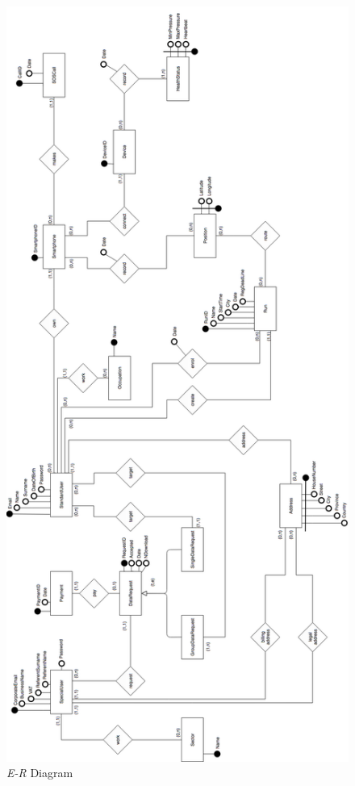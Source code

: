 \begin{figure}[H]
  \begin{center}
  	\includegraphics[height=0.68\paperheight]{./img/ER.png}
    \hspace{0.05\linewidth}
    \centering
    \caption{\textit{E-R} Diagram}
		\label{img:ER_Diagram}
    \end{center}
\end{figure}

